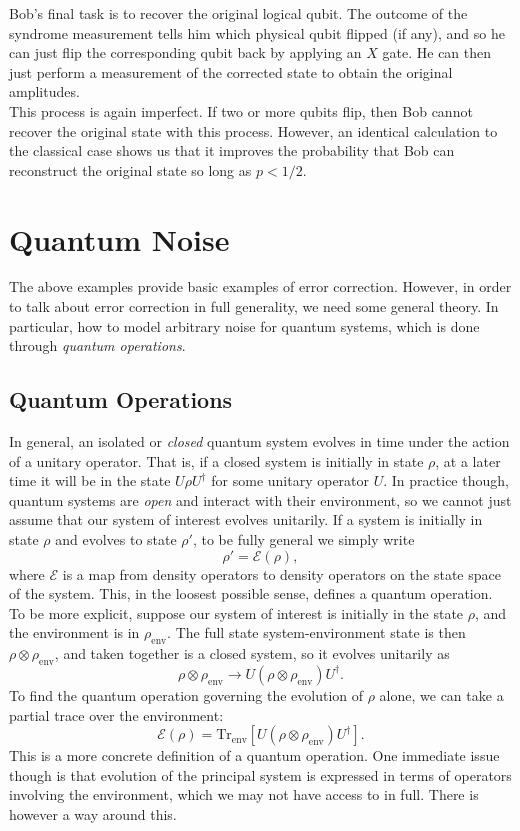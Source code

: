 \documentclass[12pt,a4paper]{report}
\numberwithin{equation}{section}
\theoremstyle{definition}
\theoremstyle{theorem}
\theoremstyle{theorem}
\theoremstyle{example}
\theoremstyle{definition}
\begin{document}
Bob's final task is to recover the original logical qubit. The outcome of the syndrome measurement tells him which physical qubit flipped (if any), and so he can just flip the corresponding qubit back by applying an $X$ gate. He can then just perform a measurement of the corrected state to obtain the original amplitudes.\\
This process is again imperfect. If two or more qubits flip, then Bob cannot recover the original state with this process. However, an identical calculation to the classical case shows us that it improves the probability that Bob can reconstruct the original state so long as $p<1/2$.
\section{Quantum Noise}
The above examples provide basic examples of error correction. However, in order to talk about error correction in full generality, we need some general theory. In particular, how to model arbitrary noise for quantum systems, which is done through \textit{quantum operations}.
\subsection{Quantum Operations}
In general, an isolated or \textit{closed} quantum system evolves in time under the action of a unitary operator. That is, if a closed system is initially in state $\rho$, at a later time it will be in the state $U\rho U^{\dagger}$ for some unitary operator $U$. In practice though, quantum systems are \textit{open} and interact with their environment, so we cannot just assume that our system of interest evolves unitarily. If a system is initially in state $\rho$ and evolves to state $\rho'$, to be fully general we simply write
\begin{equation}
	\rho'=\mathcal{E}(\rho),
\end{equation}
where $\mathcal{E}$ is a map from density operators to density operators on the state space of the system. This, in the loosest possible sense, defines a quantum operation.\\
To be more explicit, suppose our system of interest is initially in the state $\rho$, and the environment is in $\rho_{\text{env}}$. The full state system-environment state is then $\rho\otimes\rho_{\text{env}}$, and taken together is a closed system, so it evolves unitarily as 
\begin{equation}
	\rho\otimes\rho_{\text{env}}\to U\left(\rho\otimes\rho_{\text{env}}\right)U^{\dagger}.
\end{equation}
To find the quantum operation governing the evolution of $\rho$ alone, we can take a partial trace over the environment:
\begin{equation}\label{qop}
	\mathcal{E}(\rho)=\text{Tr}_{\text{env}}\left[U(\rho\otimes\rho_{\text{env}})U^{\dagger}\right].
\end{equation}
This is a more concrete definition of a quantum operation. One immediate issue though is that evolution of the principal system is expressed in terms of operators involving the environment, which we may not have access to in full. There is however a way around this.
\end{document}
